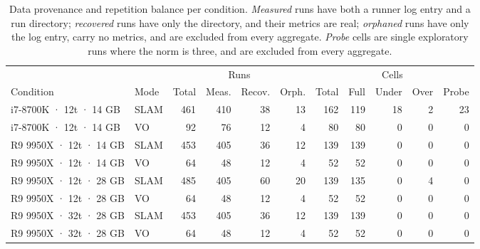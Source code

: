 \begin{table}[htbp]
\centering
\caption{Data provenance and repetition balance per condition. \emph{Measured} runs have both a runner log entry and a run directory; \emph{recovered} runs have only the directory, and their metrics are real; \emph{orphaned} runs have only the log entry, carry no metrics, and are excluded from every aggregate. \emph{Probe} cells are single exploratory runs where the norm is three, and are excluded from every aggregate.}
\label{tab:provenance}
\begin{tabular}{llrrrrrrrrr}
\toprule
 & & \multicolumn{4}{c}{Runs} & \multicolumn{5}{c}{Cells} \\
\cmidrule(lr){3-6}\cmidrule(lr){7-11}
Condition & Mode & Total & Meas. & Recov. & Orph. & Total & Full & Under & Over & Probe \\
\midrule
i7-8700K · 12t · 14 GB & SLAM & 461 & 410 & 38 & 13 & 162 & 119 & 18 & 2 & 23 \\
i7-8700K · 12t · 14 GB & VO & 92 & 76 & 12 & 4 & 80 & 80 & 0 & 0 & 0 \\
R9 9950X · 12t · 14 GB & SLAM & 453 & 405 & 36 & 12 & 139 & 139 & 0 & 0 & 0 \\
R9 9950X · 12t · 14 GB & VO & 64 & 48 & 12 & 4 & 52 & 52 & 0 & 0 & 0 \\
R9 9950X · 12t · 28 GB & SLAM & 485 & 405 & 60 & 20 & 139 & 135 & 0 & 4 & 0 \\
R9 9950X · 12t · 28 GB & VO & 64 & 48 & 12 & 4 & 52 & 52 & 0 & 0 & 0 \\
R9 9950X · 32t · 28 GB & SLAM & 453 & 405 & 36 & 12 & 139 & 139 & 0 & 0 & 0 \\
R9 9950X · 32t · 28 GB & VO & 64 & 48 & 12 & 4 & 52 & 52 & 0 & 0 & 0 \\
\bottomrule
\end{tabular}
\end{table}

